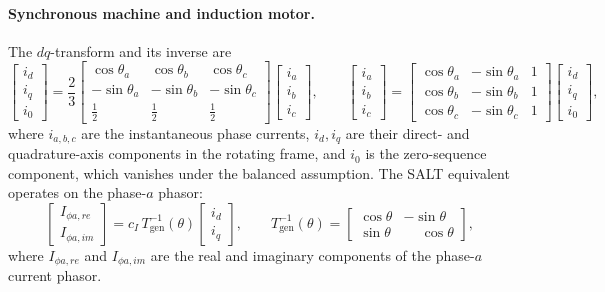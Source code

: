 \documentclass[11pt]{article}
\begin{document}
\paragraph{Synchronous machine and induction motor.}
The $dq$-transform and its inverse are
\begin{equation}
  \begin{bmatrix}i_d\\ i_q\\ i_0\end{bmatrix}
  = \frac{2}{3}
  \begin{bmatrix}
    \cos\theta_a  & \cos\theta_b  & \cos\theta_c\\
    -\sin\theta_a & -\sin\theta_b & -\sin\theta_c\\
    \tfrac{1}{2}  & \tfrac{1}{2}  & \tfrac{1}{2}
  \end{bmatrix}
  \begin{bmatrix}i_a\\ i_b\\ i_c\end{bmatrix},
  \qquad
  \begin{bmatrix}i_a\\ i_b\\ i_c\end{bmatrix}
  =
  \begin{bmatrix}
    \cos\theta_a & -\sin\theta_a & 1\\
    \cos\theta_b & -\sin\theta_b & 1\\
    \cos\theta_c & -\sin\theta_c & 1
  \end{bmatrix}
  \begin{bmatrix}i_d\\ i_q\\ i_0\end{bmatrix},
\end{equation}
where $i_{a,b,c}$ are the instantaneous phase currents, $i_d,i_q$ are their
direct- and quadrature-axis components in the rotating frame, and $i_0$ is
the zero-sequence component, which vanishes under the balanced assumption.
The SALT equivalent operates on the phase-$a$ phasor:
\begin{equation}
  \begin{bmatrix}I_{\phi a,re}\\ I_{\phi a,im}\end{bmatrix}
  = c_I\,T_{\text{gen}}^{-1}(\theta)\begin{bmatrix}i_d\\ i_q\end{bmatrix},
  \qquad
  T_{\text{gen}}^{-1}(\theta) =
  \begin{bmatrix}\cos\theta & -\sin\theta\\ \sin\theta & \phantom{-}\cos\theta\end{bmatrix},
  \label{eq:Tgen}
\end{equation}
where $I_{\phi a,re}$ and $I_{\phi a,im}$ are the real and imaginary
components of the phase-$a$ current phasor.
\end{document}
